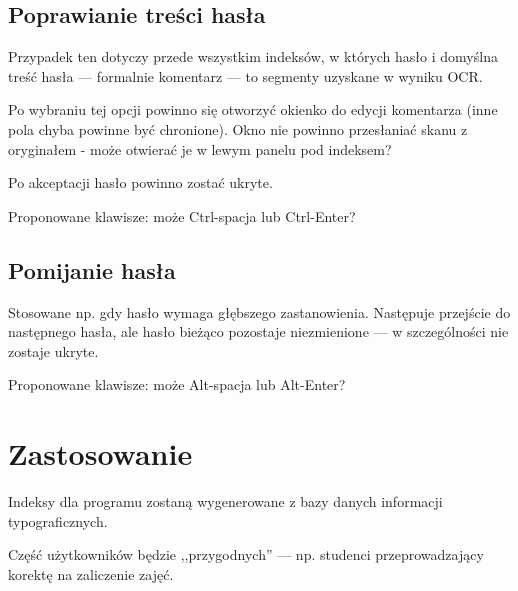 \documentclass[12]{mwart}
\begin{document}
\subsection{Poprawianie treści hasła}
\label{sec:popr-treci-hasa}

Przypadek ten dotyczy przede wszystkim indeksów, w których hasło i
domyślna treść hasła --- formalnie komentarz --- to segmenty uzyskane
w wyniku OCR.

Po wybraniu tej opcji powinno się otworzyć okienko do edycji
komentarza (inne pola chyba powinne być chronione). Okno nie powinno
przesłaniać skanu z oryginałem - może otwierać je w lewym panelu pod
indeksem?

Po akceptacji hasło powinno zostać ukryte.

Proponowane klawisze: może Ctrl-spacja lub Ctrl-Enter?

\subsection{Pomijanie hasła}
\label{sec:pomijanie-hasa}

Stosowane np. gdy hasło wymaga głębszego zastanowienia. Następuje
przejście do następnego hasła, ale hasło bieżąco pozostaje
niezmienione --- w szczególności nie zostaje ukryte.

Proponowane klawisze: może Alt-spacja lub Alt-Enter?


\section{Zastosowanie}
\label{sec:zastosowanie}

Indeksy dla programu zostaną wygenerowane z bazy danych informacji
typograficznych.

Część użytkowników będzie ,,przygodnych'' --- np. studenci
przeprowadzający korektę na zaliczenie zajęć.
\end{document}
